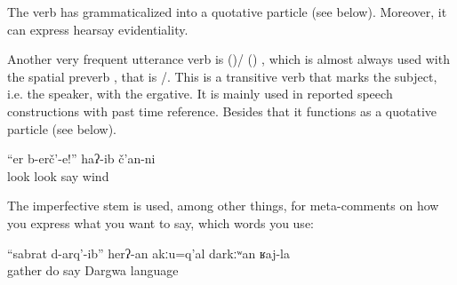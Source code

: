 The verb  has grammaticalized into a quotative particle (see below). Moreover, it can express hearsay evidentiality.

Another very frequent utterance verb is  ()\slash{} () , which is almost always used with the spatial preverb  , that is \slash{}. This is a transitive verb that marks the subject, i.e. the speaker, with the ergative. It is mainly used in reported speech constructions with past time reference. Besides that it functions as a quotative particle (see below).
%
\begin{exe}
	\ex	\label{ex:‎‎Look!, said the wind}
	\gll	``er	b-erč'-e!''	haʔ-ib	č'an-ni\\
		look	look	say	wind\\
	\glt	{}
\end{exe}

The imperfective stem is used, among other things, for meta-comments on how you express what you want to say, which words you use:
%
\begin{exe}
	\ex	\label{ex:Gather did, you should not say in Dargwa}
	\gll	``sabrat		d-arq'-ib''	herʔ-an	akːu=q'al	darkːʷan	ʁaj-la	\\
		gather	do	say		Dargwa	language\\
	\glt	{}
\end{exe}

